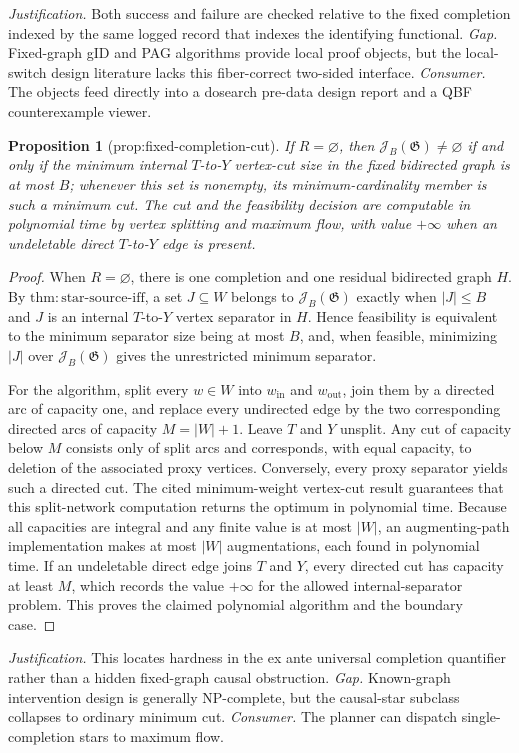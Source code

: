 \documentclass{article}
\newtheorem{proposition}{Proposition}
\begin{document}
\par\smallskip\noindent \textit{Justification.} Both success and failure are checked relative to the fixed completion indexed by the same logged record that indexes the identifying functional. \textit{Gap.} Fixed-graph gID and PAG algorithms provide local proof objects, but the local-switch design literature lacks this fiber-correct two-sided interface. \textit{Consumer.} The objects feed directly into a dosearch pre-data design report and a QBF counterexample viewer.

\begin{proposition}[prop:fixed-completion-cut]\label{prop:fixed-completion-cut}
If \(R=\varnothing\), then \(\mathcal J_B(\mathfrak G)\ne\varnothing\) if and only if the minimum internal \(T\)-to-\(Y\) vertex-cut size in the fixed bidirected graph is at most \(B\); whenever this set is nonempty, its minimum-cardinality member is such a minimum cut. The cut and the feasibility decision are computable in polynomial time by vertex splitting and maximum flow, with value \(+\infty\) when an undeletable direct \(T\)-to-\(Y\) edge is present.
\end{proposition}
\begin{proof}
When \(R=\varnothing\), there is one completion and one residual bidirected graph \(H\).  By \(\mathrm{thm{:}star\text{-}source\text{-}iff}\), a set \(J\subseteq W\) belongs to \(\mathcal J_B(\mathfrak G)\) exactly when \(|J|\le B\) and \(J\) is an internal \(T\)-to-\(Y\) vertex separator in \(H\).  Hence feasibility is equivalent to the minimum separator size being at most \(B\), and, when feasible, minimizing \(|J|\) over \(\mathcal J_B(\mathfrak G)\) gives the unrestricted minimum separator.

For the algorithm, split every \(w\in W\) into \(w_{\mathrm{in}}\) and \(w_{\mathrm{out}}\), join them by a directed arc of capacity one, and replace every undirected edge by the two corresponding directed arcs of capacity \(M=|W|+1\).  Leave \(T\) and \(Y\) unsplit.  Any cut of capacity below \(M\) consists only of split arcs and corresponds, with equal capacity, to deletion of the associated proxy vertices.  Conversely, every proxy separator yields such a directed cut.  The cited minimum-weight vertex-cut result guarantees that this split-network computation returns the optimum in polynomial time.  Because all capacities are integral and any finite value is at most \(|W|\), an augmenting-path implementation makes at most \(|W|\) augmentations, each found in polynomial time.  If an undeletable direct edge joins \(T\) and \(Y\), every directed cut has capacity at least \(M\), which records the value \(+\infty\) for the allowed internal-separator problem.  This proves the claimed polynomial algorithm and the boundary case.
\end{proof}
\par\smallskip\noindent \textit{Justification.} This locates hardness in the ex ante universal completion quantifier rather than a hidden fixed-graph causal obstruction. \textit{Gap.} Known-graph intervention design is generally NP-complete, but the causal-star subclass collapses to ordinary minimum cut. \textit{Consumer.} The planner can dispatch single-completion stars to maximum flow.
\end{document}
